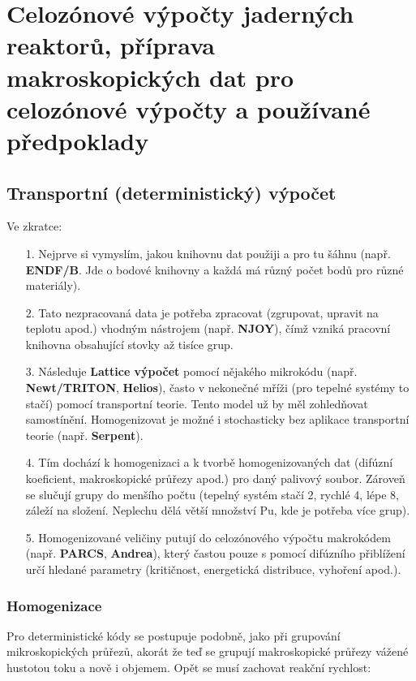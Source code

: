 \section[Celozónové výpočty]{Celozónové výpočty jaderných reaktorů, příprava makroskopických dat pro celozónové výpočty a používané předpoklady}

\subsection{Transportní (deterministický) výpočet}

Ve zkratce: 

\begin{enumerate}
  \item[1.] Nejprve si vymyslím, jakou knihovnu dat použiji a pro tu šáhnu (např. \textbf{ENDF/B}. Jde o bodové knihovny a každá má různý počet bodů pro různé materiály).
  \item[2.] Tato nezpracovaná data je potřeba zpracovat (zgrupovat, upravit na teplotu apod.) vhodným nástrojem (např. \textbf{NJOY}), čímž vzniká pracovní knihovna obsahující stovky až tisíce grup.
  \item[3.] Následuje \textbf{Lattice výpočet} pomocí nějakého mikrokódu (např. \textbf{Newt/TRITON}, \textbf{Helios}), často v nekonečné mříži (pro tepelné systémy to stačí) pomocí transportní teorie. Tento model už by měl zohledňovat samostínění. Homogenizovat je možné i stochasticky bez aplikace transportní teorie (např. \textbf{Serpent}).
  \item[4.] Tím dochází k homogenizaci a k tvorbě homogenizovaných dat (difúzní koeficient, makroskopické průřezy apod.) pro daný palivový soubor. Zároveň se slučují grupy do menšího počtu (tepelný systém stačí 2, rychlé 4, lépe 8, záleží na složení. Neplechu dělá větší množství Pu, kde je potřeba více grup).
  \item[5.] Homogenizované veličiny putují do celozónového výpočtu makrokódem (např. \textbf{PARCS}, \textbf{Andrea}), který častou pouze s pomocí difúzního přiblížení určí hledané parametry (kritičnost, energetická distribuce, vyhoření apod.).
\end{enumerate}

\subsubsection{Homogenizace}

Pro deterministické kódy se postupuje podobně, jako při grupování mikroskopických průřezů, akorát že teď se grupují makroskopické průřezy vážené hustotou toku a nově i objemem. Opět se musí zachovat reakční rychlost:


